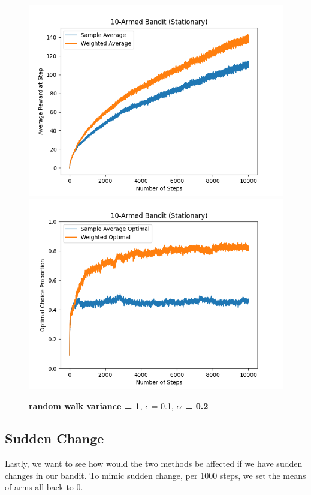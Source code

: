 \documentclass{article}
\begin{document}
\begin{figure}[h!]
\centering
\includegraphics[scale=.6]{RL_A1_pics/alpha/walk1alpha0.2.png}
\includegraphics[scale=.6]{RL_A1_pics/alpha/optimal/walk1alpha0.2.png}
\caption{\textbf{random walk variance = 1}, $\epsilon$ = 0.1, \textbf{$\alpha$ = 0.2}}
\label{fig:10-Armed1}
\end{figure}


\subsection{Sudden Change}
Lastly, we want to see how would the two methods be affected if we have sudden changes in our bandit. To mimic sudden change, per 1000 steps, we set the means of arms all back to 0.
\end{document}

